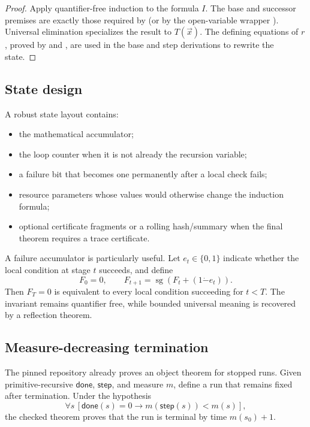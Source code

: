 \begin{proof}
Apply quantifier-free induction to the formula \(I\).  The base and successor premises are exactly
those required by  (or by the open-variable wrapper ).  Universal
elimination specializes the result to \(T(\vec x)\).  The defining equations of \(r\), proved by
 and , are used in the base and step derivations to rewrite the state.
\end{proof}

\subsection{State design}

A robust state layout contains:

\begin{itemize}
\item the mathematical accumulator;
\item the loop counter when it is not already the recursion variable;
\item a failure bit that becomes one permanently after a local check fails;
\item resource parameters whose values would otherwise change the induction formula;
\item optional certificate fragments or a rolling hash/summary when the final theorem requires a
      trace certificate.
\end{itemize}

A failure accumulator is particularly useful.  Let \(e_t\in\{0,1\}\) indicate whether the local
condition at stage \(t\) succeeds, and define
\[
 F_0=0,\qquad F_{t+1}=\operatorname{sg}(F_t+(1\mathbin{\dot-}e_t)).
\]
Then \(F_T=0\) is equivalent to every local condition succeeding for \(t<T\).  The invariant remains
quantifier free, while bounded universal meaning is recovered by a reflection theorem.

\subsection{Measure-decreasing termination}

The pinned repository already proves an object theorem for stopped runs.  Given primitive-recursive
\(\mathsf{done}\), \(\mathsf{step}\), and measure \(m\), define a run that remains fixed after
termination.  Under the hypothesis
\[
 \forall s\,[\mathsf{done}(s)=0\to m(\mathsf{step}(s))<m(s)],
\]
the checked theorem proves that the run is terminal by time \(m(s_0)+1\).

